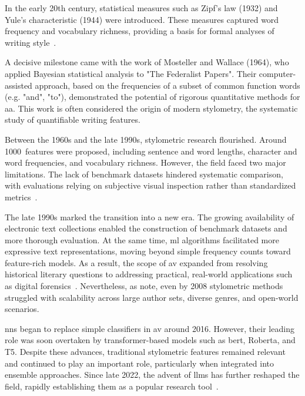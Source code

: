 
In the early 20th century, statistical measures such as Zipf's law (1932) and Yule's characteristic (1944) were introduced. 
These measures captured word frequency and vocabulary richness, providing a basis for formal analyses of writing style~\citep{neal_surveying_2018,stamatatos_survey_2009}.

A decisive milestone came with the work of Mosteller and Wallace (1964), who applied Bayesian statistical analysis to "The Federalist Papers".
Their computer-assisted approach, based on the frequencies of a subset of common function words (e.g. "and", "to"), demonstrated the potential of rigorous quantitative methods for \ac{aa}. 
This work is often considered the origin of modern stylometry, the systematic study of quantifiable writing features.

Between the 1960s and the late 1990s, stylometric research flourished.
Around \num{1000}~features were proposed, including sentence and word lengths, character and word frequencies, and vocabulary richness. 
However, the field faced two major limitations. 
The lack of benchmark datasets hindered systematic comparison, with evaluations relying on subjective visual inspection rather than standardized metrics~\citep{stamatatos_survey_2009}.

The late 1990s marked the transition into a new era. 
The growing availability of electronic text collections enabled the construction of benchmark datasets and more thorough evaluation. 
At the same time, \ac{ml} algorithms facilitated more expressive text representations, moving beyond simple frequency counts toward feature-rich models. 
As a result, the scope of \ac{av} expanded from resolving historical literary questions to addressing practical, real-world applications such as digital forensics~\citep{stamatatos_survey_2009}. 
Nevertheless, as \citet{abbasi_writeprints_2008} note, even by 2008 stylometric methods struggled with scalability across large author sets, diverse genres, and open-world scenarios.

\acp{nn} began to replace simple classifiers in \ac{av} around 2016. 
However, their leading role was soon overtaken by transformer-based models such as \acs{bert}, Ro\acs{bert}a, and T5. 
Despite these advances, traditional stylometric features remained relevant and continued to play an important role, particularly when integrated into ensemble approaches. 
Since late 2022, the advent of \acp{llm} has further reshaped the field, rapidly establishing them as a popular research tool~\citep{schmidt_llm_av_latin_24}.
